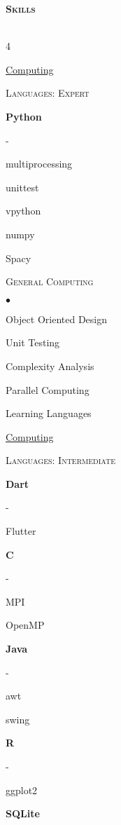 \documentclass{article}
\newcommand{\lineunder}{\vspace*{-8pt} \\ \hspace*{-18pt} \hrulefill \\}
\newcommand{\header}[1]{{\vspace*{8pt}\hspace*{-16pt} \textsc{\textbf{\large{#1}}}} \vspace*{4pt} \lineunder \vspace*{4pt}}
\newcommand{\skilltype}[1]{{\large \underline{#1}} \vspace{3pt} \\}
\newcommand{\skilllevel}[1]{
	\textsc{#1} \\ \vspace*{2pt}
	}
\newcommand{\languageskill}[1]{
    \hspace*{10pt} \textbf{#1}
    }
\newenvironment{skilllist}{\begin{list}{$\bullet$}{\topsep 0pt \itemsep -2pt}}{\vspace*{4pt}\end{list}}
\newenvironment{subskilllist}{\begin{list}{-}{\topsep 0pt \itemsep -2pt}}{\vspace*{4pt}\end{list}}
\begin{document}
\header{Skills}
\vspace{-12pt}
\begin{multicols}{4}
\raggedcolumns
    
    \skilltype{Computing}
    \vspace{2pt}
    \skilllevel{Languages: Expert}
        \languageskill{Python}
            \begin{subskilllist}
            \item multiprocessing
            \item unittest
            \item vpython
            \item numpy
            \item Spacy 
            \end{subskilllist}
        
        \skilllevel{General Computing}
        
        \begin{skilllist}
            \item Object Oriented Design
            \item Unit Testing
            \item Complexity Analysis
            \item Parallel Computing
            \item Learning Languages
        \end{skilllist}
            

    
        \columnbreak
    
    \skilltype{Computing}
    \vspace{2pt}
    \skilllevel{Languages: Intermediate}
        \languageskill{Dart} 
            \begin{subskilllist}
            \item Flutter
            \end{subskilllist}
        \languageskill{C}
            \begin{subskilllist}
            \item MPI
            \item OpenMP
            \end{subskilllist}
        
        \languageskill{Java}
            \begin{subskilllist}
            \item awt
            \item swing
            \end{subskilllist}
        \languageskill{R}
            \begin{subskilllist}
                \item ggplot2
            \end{subskilllist}
        \languageskill{SQLite}
        

\end{multicols}
\end{document}

